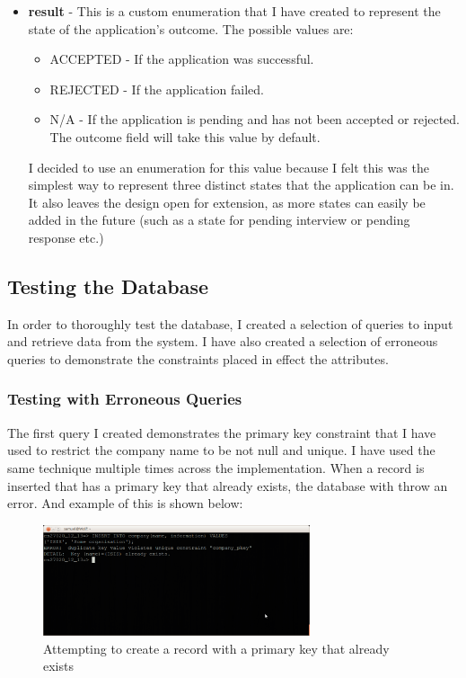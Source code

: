 \documentclass{article}
\begin{document}
\begin{itemize}
\item \textbf{result} - This is a custom enumeration that I have created to represent the state of the application's outcome. The possible values are:

\begin{itemize}
	\item ACCEPTED - If the application was successful.
	\item REJECTED - If the application failed.
	\item N/A - If the application is pending and has not been accepted or rejected. The outcome field will take this value by default.
\end{itemize}

I decided to use an enumeration for this value because I felt this was the simplest way to represent three distinct states that the application can be in. It also leaves the design open for extension, as more states can easily be added in the future (such as a state for pending interview or pending response etc.)

\end{itemize}

\subsection{Testing the Database}
In order to thoroughly test the database, I created a selection of queries to input and retrieve data from the system. I have also created a selection of erroneous queries to demonstrate the constraints placed in effect the attributes.

\subsubsection{Testing with Erroneous Queries}
The first query I created demonstrates the primary key constraint that I have used to restrict the company name to be not null and unique. I have used the same technique multiple times across the implementation. When a record is inserted that has a primary key that already exists, the database with throw an error. And example of this is shown below:

\begin{figure}[H]
\centering
\includegraphics[width=0.7\textwidth]{img/test/test-pkey.png}
\caption{Attempting to create a record with a primary key that already exists}
\label{fig:test-pkey}
\end{figure}
\end{document}
